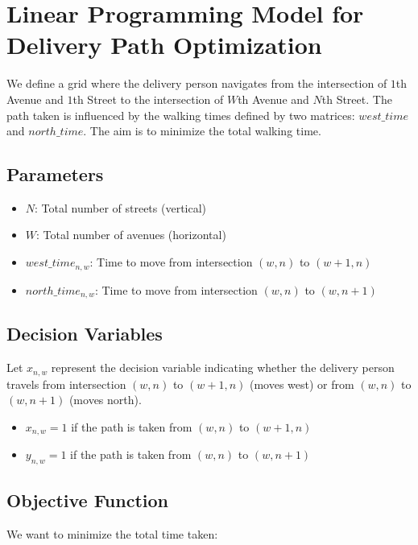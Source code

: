 \documentclass{article}
\begin{document}
\section*{Linear Programming Model for Delivery Path Optimization}

We define a grid where the delivery person navigates from the intersection of \(1\)th Avenue and \(1\)th Street to the intersection of \(W\)th Avenue and \(N\)th Street. The path taken is influenced by the walking times defined by two matrices: \(west\_time\) and \(north\_time\). The aim is to minimize the total walking time.

\subsection*{Parameters}

\begin{itemize}
    \item \(N\): Total number of streets (vertical)
    \item \(W\): Total number of avenues (horizontal)
    \item \(west\_time_{n,w}\): Time to move from intersection \((w,n)\) to \((w+1,n)\)
    \item \(north\_time_{n,w}\): Time to move from intersection \((w,n)\) to \((w,n+1)\)
\end{itemize}

\subsection*{Decision Variables}

Let \(x_{n,w}\) represent the decision variable indicating whether the delivery person travels from intersection \((w,n)\) to \((w+1,n)\) (moves west) or from \((w,n)\) to \((w,n+1)\) (moves north).

\begin{itemize}
    \item \(x_{n,w} = 1\) if the path is taken from \((w,n)\) to \((w+1,n)\)
    \item \(y_{n,w} = 1\) if the path is taken from \((w,n)\) to \((w,n+1)\)
\end{itemize}

\subsection*{Objective Function}

We want to minimize the total time taken:
\end{document}
